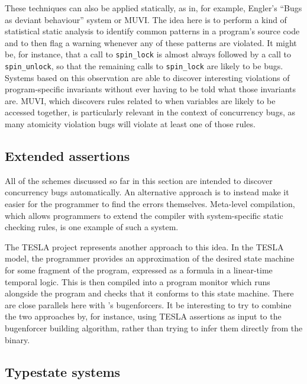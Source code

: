 These techniques can also be applied statically, as in, for example,
Engler's ``Bugs as deviant behaviour''
system\cite{Engler2001} or MUVI\cite{Lu2007}.  The idea
here is to perform a kind of statistical static analysis to identify
common patterns in a program's source code and to then flag a warning
whenever any of these patterns are violated.  It might be, for
instance, that a call to \texttt{spin\_lock} is almost always followed
by a call to \texttt{spin\_unlock}, so that the remaining calls to
\texttt{spin\_lock} are likely to be bugs.  Systems based on this
observation are able to discover interesting violations of
program-specific invariants without ever having to be told what those
invariants are.  MUVI\cite{Lu2007}, which discovers rules related to
when variables are likely to be accessed together, is particularly
relevant in the context of concurrency bugs, as many atomicity
violation bugs will violate at least one of those rules.

\subsection{Extended assertions}

All of the schemes discussed so far in this section are intended to
discover concurrency bugs automatically.  An alternative approach is
to instead make it easier for the programmer to find the errors
themselves.  Meta-level compilation\cite{Engler2000a}, which allows
programmers to extend the compiler with system-specific static
checking rules, is one example of such a system.

The TESLA project\cite{Watson2013} represents another approach to this idea.  In the TESLA model,
the programmer provides an approximation of the desired state machine
for some fragment of the program, expressed as a formula in a
linear-time temporal logic.  This is then compiled into a program
monitor which runs alongside the program and checks that it conforms
to this state machine.  There are close parallels here with
{\technique}'s \glspl{bugenforcer}.  It be interesting to try to
combine the two approaches by, for instance, using TESLA assertions as
input to the \gls{bugenforcer} building algorithm, rather than trying
to infer them directly from the binary.

\subsection{Typestate systems}

